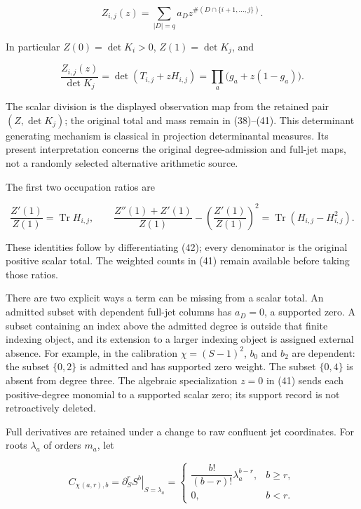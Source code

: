 \documentclass[
  11pt,
]{article}
\begin{document}
\[
 \boxed{Z_{i,j}(z)=
 \sum_{|D|=q}a_Dz^{\#(D\cap\{i+1,\ldots,j\})}.}                \tag{41}
\]

In particular \(Z(0)=\det K_i>0\), \(Z(1)=\det K_j\), and

\[
 \boxed{\frac{Z_{i,j}(z)}{\det K_j}
 =\det(T_{i,j}+zH_{i,j})
 =\prod_a\bigl(g_a+z(1-g_a)\bigr).}                              \tag{42}
\]

The scalar division is the displayed observation map from the retained
pair \((Z,\det K_j)\); the original total and mass remain in (38)--(41).
This determinant generating mechanism is classical in projection
determinantal measures. Its present interpretation concerns the original
degree-admission and full-jet maps, not a randomly selected alternative
arithmetic source.

The first two occupation ratios are

\[
 \frac{Z'(1)}{Z(1)}=\operatorname{Tr}H_{i,j},\qquad
 \frac{Z''(1)+Z'(1)}{Z(1)}
 -\left(\frac{Z'(1)}{Z(1)}\right)^2
 =\operatorname{Tr}(H_{i,j}-H_{i,j}^2).                           \tag{43}
\]

These identities follow by differentiating (42); every denominator is
the original positive scalar total. The weighted counts in (41) remain
available before taking those ratios.

There are two explicit ways a term can be missing from a scalar total.
An admitted subset with dependent full-jet columns has \(a_D=0\), a
supported zero. A subset containing an index above the admitted degree
is outside that finite indexing object, and its extension to a larger
indexing object is assigned external absence. For example, in the
calibration \(\chi=(S-1)^2\), \(b_0\) and \(b_2\) are dependent: the
subset \(\{0,2\}\) is admitted and has supported zero weight. The subset
\(\{0,4\}\) is absent from degree three. The algebraic specialization
\(z=0\) in (41) sends each positive-degree monomial to a supported
scalar zero; its support record is not retroactively deleted.

Full derivatives are retained under a change to raw confluent jet
coordinates. For roots \(\lambda_a\) of orders \(m_a\), let

\[
 C_\chi{}_{(a,r),b}
 =\left.\partial_S^rS^b\right|_{S=\lambda_a}
 =\begin{cases}\dfrac{b!}{(b-r)!}\lambda_a^{b-r},&b\ge r,\\0,&b<r.
 \end{cases}                                                     \tag{44}
\]
\end{document}
